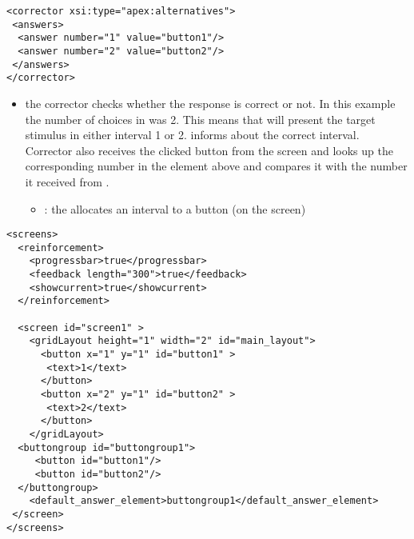 



\begin{lstlisting}
<corrector xsi:type="apex:alternatives">
 <answers>
  <answer number="1" value="button1"/>
  <answer number="2" value="button2"/>
 </answers>
</corrector>
\end{lstlisting}
 

\begin{itemize}
\item {} the corrector checks whether the
response is correct or not. In this example the number of choices
in  was 2. This means that 
will present the target stimulus in either interval 1 or 2.
 informs  about the correct
interval. Corrector also receives the clicked button from the
screen and looks up the corresponding number in the
 element above and compares it with the number it
received from .

\begin{itemize}

\item {}: the  allocates an interval
to a button (on the screen)

\end{itemize}
\end{itemize}

\begin{lstlisting}
<screens>
  <reinforcement>
    <progressbar>true</progressbar>
    <feedback length="300">true</feedback>
    <showcurrent>true</showcurrent>
  </reinforcement>

  <screen id="screen1" >
    <gridLayout height="1" width="2" id="main_layout">
      <button x="1" y="1" id="button1" >
       <text>1</text>
      </button>
      <button x="2" y="1" id="button2" >
       <text>2</text>
      </button>
    </gridLayout>
  <buttongroup id="buttongroup1">
     <button id="button1"/>
     <button id="button2"/>
  </buttongroup>
    <default_answer_element>buttongroup1</default_answer_element>
 </screen>
</screens>
\end{lstlisting}

